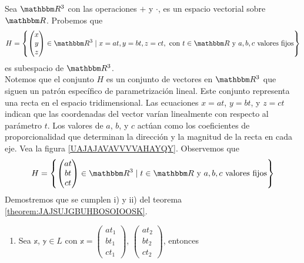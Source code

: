 \begin{example}
    Sea $\RR[3]$ con las operaciones $+$ y $\cdot$, es un espacio vectorial sobre $\RR$. Probemos que
    $$H = \left\{ \begin{pmatrix} x \\ y \\ z \end{pmatrix} \in \RR[3] \mid x = at, y = bt, z = ct, \text{ con } t \in \RR \text{ y } a, b, c \text{ valores fijos} \right\}$$
    es subespacio de $\RR[3]$. \\
    \solucion Notemos que el conjunto $H$ es un conjunto de vectores en $\RR[3]$ que siguen un patrón específico de parametrización lineal. Este conjunto representa una recta en el espacio tridimensional. Las ecuaciones $x = at$, $y = bt$, y $z = ct$ indican que las coordenadas del vector varían linealmente con respecto al parámetro $t$. Los valores de $a$, $b$, y $c$ actúan como los coeficientes de proporcionalidad que determinan la dirección y la magnitud de la recta en cada eje. Vea la figura \ref{UAJAJAVAVVVVAHAYQY}. Observemos que
    $$H = \left\{ \begin{pmatrix} at \\ bt \\ ct \end{pmatrix} \in \RR[3] \mid t \in \RR \text{ y } a, b, c \text{ valores fijos} \right\}$$
    Demostremos que se cumplen i) y ii) del teorema \ref{theorem:JAJSUJGBUHBOSOIOOSK}.
    \begin{enumerate}[label=\roman*)]
        \item Sea $\mathbb{x}$, $\mathbb{y} \in L$ con $\displaystyle \mathbb{x} = \begin{pmatrix} at_1 \\ bt_1 \\ ct_1 \end{pmatrix}$, $\displaystyle \begin{pmatrix} at_2 \\ bt_2 \\ ct_2 \end{pmatrix}$, entonces

\end{enumerate}
\end{example}
